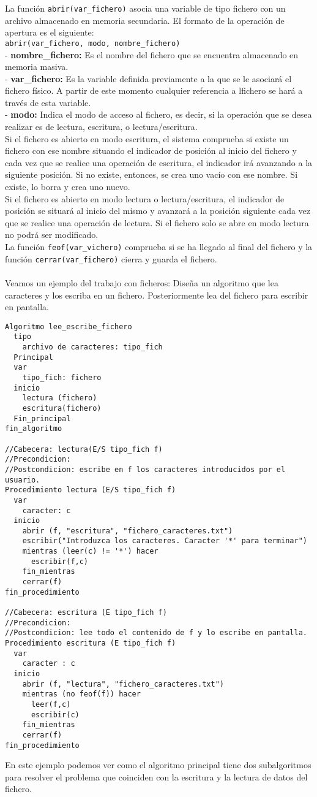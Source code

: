 \documentclass[12pt,letterpaper]{article}
\begin{document}
La función \texttt{abrir(var\_fichero)} asocia una variable de tipo fichero con un archivo almacenado en memoria secundaria. El formato de la operación de apertura es el siguiente:\\
\texttt{abrir(var\_fichero, modo, nombre\_fichero)}\\
- \textbf{nombre\_fichero:} Es el nombre del fichero que se encuentra almacenado en memoria masiva.\\
- \textbf{var\_fichero:} Es la variable definida previamente a la que se le asociará el fichero físico. A partir de este momento cualquier referencia a lfichero se hará a través de esta variable.\\
- \textbf{modo:} Indica el modo de acceso al fichero, es decir, si la operación que se desea realizar es de lectura, escritura, o lectura/escritura.\\
Si el fichero es abierto en modo escritura, el sistema comprueba si existe un fichero con ese nombre situando el indicador de posición al inicio del fichero y cada vez que se realice una operación de escritura, el indicador irá avanzando a la siguiente posición. Si no existe, entonces, se crea uno vacío con ese nombre. Si existe, lo borra y crea uno nuevo.\\
Si el fichero es abierto en modo lectura o lectura/escritura, el indicador de posición se situará al inicio del mismo y avanzará a la posición siguiente cada vez que se realice una operación de lectura. Si el fichero solo se abre en modo lectura no podrá ser modificado.\\
La función \texttt{feof(var\_vichero)} comprueba si se ha llegado al final del fichero y la función \texttt{cerrar(var\_fichero)} cierra y guarda el fichero.\\\\
Veamos un ejemplo del trabajo con ficheros:
Diseña un algoritmo que lea caracteres y los escriba en un fichero. Posteriormente lea del fichero para escribir en pantalla.
\begin{lstlisting}
Algoritmo lee_escribe_fichero
  tipo
    archivo de caracteres: tipo_fich
  Principal
  var
    tipo_fich: fichero
  inicio
    lectura (fichero)
    escritura(fichero)
  Fin_principal
fin_algoritmo
	
//Cabecera: lectura(E/S tipo_fich f)
//Precondicion:
//Postcondicion: escribe en f los caracteres introducidos por el usuario.
Procedimiento lectura (E/S tipo_fich f)
  var
    caracter: c
  inicio
    abrir (f, "escritura", "fichero_caracteres.txt")
    escribir("Introduzca los caracteres. Caracter '*' para terminar")
    mientras (leer(c) != '*') hacer
      escribir(f,c)
    fin_mientras
    cerrar(f)
fin_procedimiento
	
//Cabecera: escritura (E tipo_fich f)
//Precondicion:
//Postcondicion: lee todo el contenido de f y lo escribe en pantalla.
Procedimiento escritura (E tipo_fich f)
  var
    caracter : c
  inicio
    abrir (f, "lectura", "fichero_caracteres.txt")
    mientras (no feof(f)) hacer
      leer(f,c)
      escribir(c)
    fin_mientras
    cerrar(f)
fin_procedimiento
\end{lstlisting}
En este ejemplo podemos ver como el algoritmo principal tiene dos subalgoritmos para resolver el problema que coinciden con la escritura y la lectura de datos del fichero.
\end{document}
